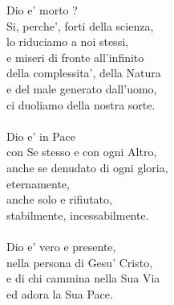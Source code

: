 \begin{haiku}

    Dio e' morto ?\\
    Si, perche', forti della scienza,\\
    lo riduciamo a noi stessi,\\
    e miseri di fronte all'infinito\\
    della complessita', della Natura\\
    e del male generato dall'uomo,\\
    ci duoliamo della nostra sorte.\\
    \leavevmode\\
    Dio e' in Pace\\
    con Se stesso e con ogni Altro,\\
    anche se denudato di ogni gloria,\\
    eternamente,\\
    anche solo e rifiutato,\\
    stabilmente, incessabilmente.\\
    \leavevmode\\
    Dio e' vero e presente,\\
    nella persona di Gesu' Cristo,\\
    e di chi cammina nella Sua Via\\
    ed adora la Sua Pace.\\

\end{haiku}
